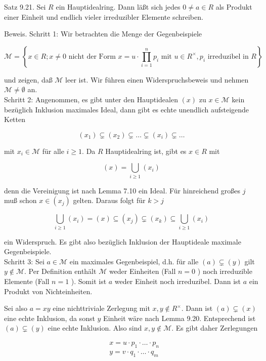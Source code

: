 \documentclass[10pt, letterpaper]{article}
\begin{document}
Satz 9.21. Sei $R$ ein Hauptidealring. Dann läßt sich jedes $0 \neq a \in R$ als Produkt einer Einheit und endlich vieler irreduzibler Elemente schreiben.

Beweis. Schritt 1: Wir betrachten die Menge der Gegenbeispiele

$$
\mathscr{M}=\left\{x \in R ; x \neq 0 \text { nicht der Form } x=u \cdot \prod_{i=1}^{n} p_{i} \text { mit } u \in R^{\times}, p_{i} \text { irreduzibel in } R\right\}
$$

und zeigen, daß $\mathscr{M}$ leer ist. Wir führen einen Widerspruchsbeweis und nehmen $\mathscr{M} \neq \emptyset$ an.\\
Schritt 2: Angenommen, es gibt unter den Hauptidealen $(x)$ zu $x \in \mathscr{M}$ kein bezüglich Inklusion maximales Ideal, dann gibt es echte unendlich aufsteigende Ketten

$$
\left(x_{1}\right) \subsetneq\left(x_{2}\right) \subsetneq \ldots \subsetneq\left(x_{i}\right) \subsetneq \ldots
$$

mit $x_{i} \in \mathscr{M}$ für alle $i \geq 1$. Da $R$ Hauptidealring ist, gibt es $x \in R$ mit

$$
(x)=\bigcup_{i \geq 1}\left(x_{i}\right)
$$

denn die Vereinigung ist nach Lemma 7.10 ein Ideal. Für hinreichend großes $j$ muß schon $x \in\left(x_{j}\right)$ gelten. Daraus folgt für $k>j$

$$
\bigcup_{i \geq 1}\left(x_{i}\right)=(x) \subseteq\left(x_{j}\right) \subsetneq\left(x_{k}\right) \subseteq \bigcup_{i \geq 1}\left(x_{i}\right)
$$

ein Widerspruch. Es gibt also bezüglich Inklusion der Hauptideale maximale Gegenbeispiele.\\
Schritt 3: Sei $a \in \mathscr{M}$ ein maximales Gegenbeispiel, d.h. für alle $(a) \subsetneq(y)$ gilt $y \notin \mathscr{M}$. Per Definition enthält $\mathscr{M}$ weder Einheiten (Fall $n=0$ ) noch irreduzible Elemente (Fall $n=1$ ). Somit ist $a$ weder Einheit noch irreduzibel. Dann ist $a$ ein Produkt von Nichteinheiten.

Sei also $a=x y$ eine nichttriviale Zerlegung mit $x, y \notin R^{\times}$. Dann ist $(a) \subsetneq(x)$ eine echte Inklusion, da sonst $y$ Einheit wäre nach Lemma 9.20. Entsprechend ist $(a) \subsetneq(y)$ eine echte Inklusion. Also sind $x, y \notin \mathscr{M}$. Es gibt daher Zerlegungen

$$
\begin{aligned}
& x=u \cdot p_{1} \cdot \ldots \cdot p_{n} \\
& y=v \cdot q_{1} \cdot \ldots \cdot q_{m}
\end{aligned}
$$
\end{document}
